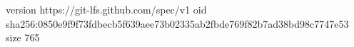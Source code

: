 version https://git-lfs.github.com/spec/v1
oid sha256:0850e9f9f73fdbecb5f639aee73b02335ab2fbde769f82b7ad38bd98c7747e53
size 765

